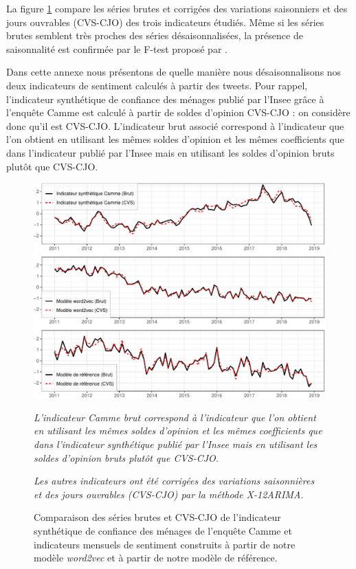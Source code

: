 \documentclass[11pt,french,french]{article}
\begin{document}
La figure \ref{fig:cvscjo} compare les séries brutes et corrigées des variations saisonniers et des jours ouvrables (CVS-CJO) des trois indicateurs étudiés.
Même si les séries brutes semblent très proches des séries désaisonnalisées, la présence de saisonnalité est confirmée par le F-test proposé par \cite{lytras}.

Dans cette annexe nous présentons de quelle manière nous désaisonnalisons nos deux indicateurs de sentiment calculés à partir des tweets.
Pour rappel, l'indicateur synthétique de confiance des ménages publié par l'Insee grâce à l'enquête Camme est calculé à partir de soldes d'opinion CVS-CJO : on considère donc qu'il est CVS-CJO.
L'indicateur brut associé correspond à l'indicateur que l'on obtient en utilisant les mêmes soldes d'opinion et les mêmes coefficients que dans l'indicateur publié par l'Insee mais en utilisant les soldes d'opinion bruts plutôt que CVS-CJO.

\begin{figure}[htp]
{\centering\includegraphics[width = \textwidth]{img/rmd-graphCVS-1}}
\captionsetup{margin=0cm,format=hang,justification=justified}
\caption{Comparaison des séries brutes et CVS-CJO de l'indicateur synthétique de confiance des ménages de l'enquête Camme et indicateurs mensuels de sentiment construits à partir de notre modèle \emph{word2vec} et à partir de notre modèle de référence.}\label{fig:cvscjo}
\footnotesize

\emph{L'indicateur Camme brut correspond à l'indicateur que l'on obtient en utilisant les mêmes soldes d'opinion et les mêmes coefficients que dans l'indicateur synthétique publié par l'Insee mais en utilisant les soldes d'opinion bruts plutôt que CVS-CJO.}

\emph{Les autres indicateurs ont été corrigées des variations saisonnières et des jours ouvrables (CVS-CJO) par la méthode X-12ARIMA.}
\end{figure}
\end{document}
